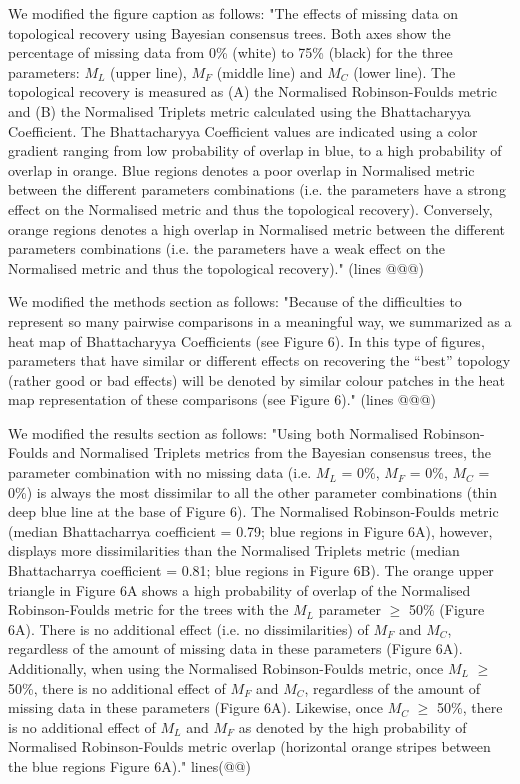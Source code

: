 \documentclass[12pt,letterpaper]{article}
\begin{document}
\begin{enumerate}
We modified the figure caption as follows:
"The effects of missing data on topological recovery using Bayesian consensus trees. Both axes show the percentage of missing data from 0\% (white) to 75\% (black) for the three parameters: $M_{L}$ (upper line), $M_{F}$ (middle line) and $M_{C}$ (lower line). The topological recovery is measured as (A) the Normalised Robinson-Foulds metric and (B) the Normalised Triplets metric calculated using the Bhattacharyya Coefficient. The Bhattacharyya Coefficient values are indicated using a color gradient ranging from low probability of overlap in blue, to a high probability of overlap in orange. Blue regions denotes a poor overlap in Normalised metric between the different parameters combinations (i.e. the parameters have a strong effect on the Normalised metric and thus the topological recovery). Conversely, orange regions denotes a high overlap in Normalised metric between the different parameters combinations (i.e. the parameters have a weak effect on the Normalised metric and thus the topological recovery)." (lines @@@)

We modified the methods section as follows:
"Because of the difficulties to represent so many pairwise comparisons in a meaningful way, we summarized as a heat map of Bhattacharyya Coefficients (see Figure 6).
In this type of figures, parameters that have similar or different effects on recovering the ``best'' topology (rather good or bad effects) will be denoted by similar colour patches in the heat map representation of these comparisons (see Figure 6)." (lines @@@)

We modified the results section as follows:
"Using both Normalised Robinson-Foulds and Normalised Triplets metrics from the Bayesian consensus trees, the parameter combination with no missing data (i.e. $M_{L}$ = 0\%, $M_{F}$ = 0\%, $M_{C}$ = 0\%) is always the most dissimilar to all the other parameter combinations (thin deep blue line at the base of Figure 6).
The Normalised Robinson-Foulds metric (median Bhattacharrya coefficient = 0.79; blue regions in Figure 6A), however, displays more dissimilarities than the Normalised Triplets metric (median Bhattacharrya coefficient = 0.81; blue regions in Figure 6B).
The orange upper triangle in Figure 6A shows a high probability of overlap of the Normalised Robinson-Foulds metric for the trees with the $M_{L}$ parameter $\geq$ 50\% (Figure 6A).
There is no additional effect (i.e. no dissimilarities) of $M_{F}$ and $M_{C}$, regardless of the amount of missing data in these parameters (Figure 6A).
Additionally, when using the Normalised Robinson-Foulds metric, once $M_{L}$ $\geq$ 50\%, there is no additional effect of $M_{F}$ and $M_{C}$, regardless of the amount of missing data in these parameters (Figure 6A).
Likewise, once $M_{C}$ $\geq$ 50\%, there is no additional effect of $M_{L}$ and $M_{F}$ as denoted by the high probability of Normalised Robinson-Foulds metric overlap (horizontal orange stripes between the blue regions Figure 6A)." lines(@@)


\end{enumerate}
\end{document}
